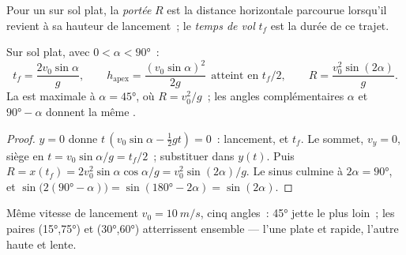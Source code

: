 \begin{definition}[Portée]\label{def:g12:projectile-motion:range}
Pour un  sur sol plat, la
\emph{portée} $R$ est la distance horizontale parcourue
lorsqu'il revient à sa hauteur de lancement~; le \emph{temps de
vol} $t_f$ est la durée de ce trajet.
\end{definition}

\begin{proposition}\label{prop:g12:projectile-motion:range}
Sur sol plat, avec $0 < \alpha < \ang{90}$~:
\[
t_f = \frac{2 v_0 \sin\alpha}{g}, \qquad
h_{\text{apex}} = \frac{(v_0\sin\alpha)^2}{2g}
\ \ \text{atteint en } t_f/2, \qquad
R = \frac{v_0^2 \sin(2\alpha)}{g}.
\]
La  est maximale à $\alpha = \ang{45}$, où
$R = v_0^2/g$~; les angles complémentaires $\alpha$ et
$\ang{90} - \alpha$ donnent la même .
\end{proposition}

\begin{proof}
$y = 0$ donne $t\,(v_0\sin\alpha - \tfrac12 gt) = 0$~: lancement, et
$t_f$. Le sommet, $v_y = 0$, siège en $t = v_0\sin\alpha/g = t_f/2$~;
substituer dans $y(t)$. Puis $R = x(t_f) = 2v_0^2\sin\alpha\cos\alpha/g =
v_0^2\sin(2\alpha)/g$. Le sinus culmine à $2\alpha = \ang{90}$, et
$\sin\bigl(2(\ang{90}-\alpha)\bigr) = \sin(\ang{180} - 2\alpha) =
\sin(2\alpha)$.
\end{proof}

\begin{omfigure}

{\small Même vitesse de lancement $v_0 = \qty{10}{m/s}$, cinq angles~: \ang{45}
jette le plus loin~; les paires (\ang{15},\ang{75}) et (\ang{30},\ang{60})
atterrissent ensemble --- l'une plate et rapide, l'autre haute et lente.}
\end{omfigure}

